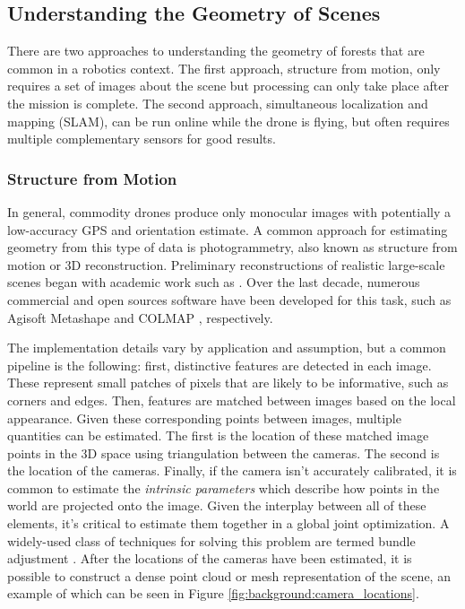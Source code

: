 \subsection{Understanding the Geometry of Scenes}
There are two approaches to understanding the geometry of forests that are common in a robotics context. The first approach, structure from motion, only requires a set of images about the scene but processing can only take place after the mission is complete. The second approach, simultaneous localization and mapping (SLAM), can be run online while the drone is flying, but often requires multiple complementary sensors for good results.
\subsubsection{Structure from Motion}
In general, commodity drones produce only monocular images with potentially a low-accuracy GPS and orientation estimate. A common approach for estimating geometry from this type of data is photogrammetry, also known as structure from motion or 3D reconstruction. Preliminary reconstructions of realistic large-scale scenes began with academic work such as \cite{Agarwal2009}. Over the last decade, numerous commercial and open sources software have been developed for this task, such as Agisoft Metashape \cite{AgisoftMetashape} and COLMAP \cite{schoenberger2016mvs, schoenberger2016sfm}, respectively.

The implementation details vary by application and assumption, but a common pipeline is the following: first, distinctive features are detected in each image. These represent small patches of pixels that are likely to be informative, such as corners and edges. Then, features are matched between images based on the local appearance. 
Given these corresponding points between images, multiple quantities can be estimated. The first is the location of these matched image points in the 3D space using triangulation between the cameras. The second is the location of the cameras. Finally, if the camera isn't accurately calibrated, it is common to estimate the \textit{intrinsic parameters} which describe how points in the world are projected onto the image. Given the interplay between all of these elements, it's critical to estimate them together in a global joint optimization. A widely-used class of techniques for solving this problem are termed bundle adjustment \cite{Triggs2000BundleSynthesis}. After the locations of the cameras have been estimated, it is possible to construct a dense point cloud or mesh representation of the scene, an example of which can be seen in Figure \ref{fig:background:camera_locations}.

